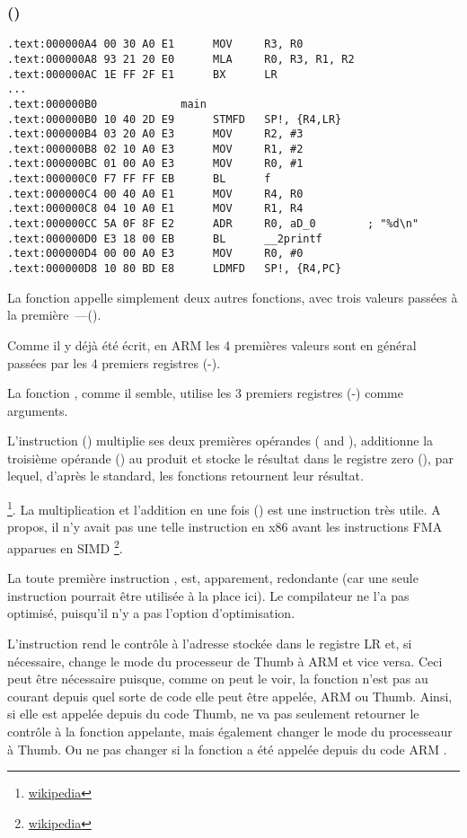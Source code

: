 \subsubsection{\NonOptimizingKeilVI (\ARMMode)}

\begin{lstlisting}[style=customasmARM]
.text:000000A4 00 30 A0 E1      MOV     R3, R0
.text:000000A8 93 21 20 E0      MLA     R0, R3, R1, R2
.text:000000AC 1E FF 2F E1      BX      LR
...
.text:000000B0             main
.text:000000B0 10 40 2D E9      STMFD   SP!, {R4,LR}
.text:000000B4 03 20 A0 E3      MOV     R2, #3
.text:000000B8 02 10 A0 E3      MOV     R1, #2
.text:000000BC 01 00 A0 E3      MOV     R0, #1
.text:000000C0 F7 FF FF EB      BL      f
.text:000000C4 00 40 A0 E1      MOV     R4, R0
.text:000000C8 04 10 A0 E1      MOV     R1, R4
.text:000000CC 5A 0F 8F E2      ADR     R0, aD_0        ; "%d\n"
.text:000000D0 E3 18 00 EB      BL      __2printf
.text:000000D4 00 00 A0 E3      MOV     R0, #0
.text:000000D8 10 80 BD E8      LDMFD   SP!, {R4,PC}
\end{lstlisting}

La fonction \main appelle simplement deux autres fonctions, avec trois valeurs passées
à la première~---(\ttf).

Comme il y déjà été écrit, en ARM les 4 premières valeurs sont en général
passées par les 4 premiers registres (-).

La fonction \ttf, comme il semble, utilise les 3 premiers registres (-) comme arguments. 

L'instruction  () multiplie ses deux premières opérandes
( and ), additionne la troisième opérande () au produit et stocke
le résultat dans le registre zero (), par lequel, d'après le standard, les
fonctions retournent leur résultat.

\footnote{\href{http://go.yurichev.com/17103}{wikipedia}}.
La multiplication et l'addition en une fois ()
est une instruction très utile. A propos, il n'y avait pas une telle instruction en
x86 avant les instructions FMA apparues en SIMD
\footnote{\href{http://go.yurichev.com/17103}{wikipedia}}.

La toute première instruction , est, apparement, redondante (car
une seule instruction  pourrait être utilisée à la place ici).
Le compilateur ne l'a pas optimisé, puisqu'il n'y a pas l'option d'optimisation.


L'instruction  rend le contrôle à l'adresse stockée dans le registre \ac{LR}
et, si nécessaire, change le mode du processeur de Thumb à ARM et vice versa.
Ceci peut être nécessaire puisque, comme on peut le voir, la fonction \ttf n'est
pas au courant depuis quel sorte de code elle peut être appelée, ARM ou Thumb.
Ainsi, si elle est appelée depuis du code Thumb,  ne va pas seulement retourner
le contrôle à la fonction appelante, mais également changer le mode du processeaur
à Thumb.
Ou ne pas changer si la fonction a été appelée depuis du code ARM .
